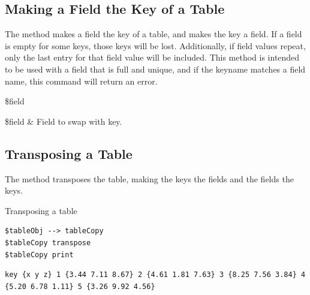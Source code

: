 \clearpage

\subsection{Making a Field the Key of a Table}
The method  makes a field the key of a table, and makes the key a field. 
If a field is empty for some keys, those keys will be lost. 
Additionally, if field values repeat, only the last entry for that field value will be included. 
This method is intended to be used with a field that is full and unique, and if the keyname matches a field name, this command will return an error.
\begin{syntax}
 \$field
\end{syntax}
\begin{args}
\$field & Field to swap with key.
\end{args}

\subsection{Transposing a Table}
The method  transposes the table, making the keys the fields and the fields the keys.
\begin{syntax}
\end{syntax}

\begin{example}{Transposing a table}
\begin{lstlisting}
$tableObj --> tableCopy
$tableCopy transpose
$tableCopy print
\end{lstlisting}
\tcblower
\begin{lstlisting}
key {x y z} 1 {3.44 7.11 8.67} 2 {4.61 1.81 7.63} 3 {8.25 7.56 3.84} 4 {5.20 6.78 1.11} 5 {3.26 9.92 4.56}
\end{lstlisting}
\end{example}